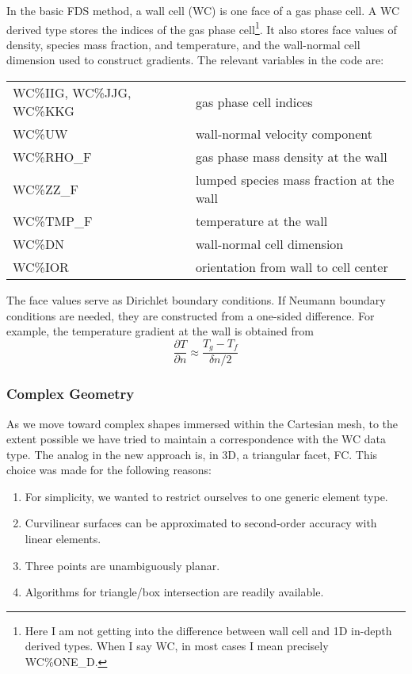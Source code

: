 \documentclass[12pt]{article}
\begin{document}
In the basic FDS method, a wall cell (WC) is one face of a gas phase cell.  A WC derived type stores the indices of the gas phase cell\footnote{Here I am not getting into the difference between wall cell and 1D in-depth derived types.  When I say WC, in most cases I mean precisely {\ct WC\%ONE\_D}.}.  It also stores face values of density, species mass fraction, and temperature, and the wall-normal cell dimension used to construct gradients.  The relevant variables in the code are:

\begin{table}[h!]
\begin{tabular}{ll}
{\ct WC\%IIG, WC\%JJG, WC\%KKG} & gas phase cell indices \\
{\ct WC\%UW}                    & wall-normal velocity component \\
{\ct WC\%RHO\_F}                & gas phase mass density at the wall \\
{\ct WC\%ZZ\_F}                 & lumped species mass fraction at the wall \\
{\ct WC\%TMP\_F}                & temperature at the wall \\
{\ct WC\%DN}                    & wall-normal cell dimension \\
{\ct WC\%IOR}                   & orientation from wall to cell center
\end{tabular}
\end{table}

The face values serve as Dirichlet boundary conditions.  If Neumann boundary conditions are needed, they are constructed from a one-sided difference.  For example, the temperature gradient at the wall is obtained from
\begin{equation}
\frac{\partial T}{\partial n} \approx \frac{T_g - T_f}{\delta n/2}
\end{equation}

\subsubsection{Complex Geometry}

As we move toward complex shapes immersed within the Cartesian mesh, to the extent possible we have tried to maintain a correspondence with the WC data type.  The analog in the new approach is, in 3D, a triangular facet, FC. This choice was made for the following reasons:
\begin{enumerate}[{\,\,\,\,(}a{)}]
\item For simplicity, we wanted to restrict ourselves to one generic element type.
\item Curvilinear surfaces can be approximated to second-order accuracy with linear elements.
\item Three points are unambiguously planar.
\item Algorithms for triangle/box intersection are readily available.
\end{enumerate}
\end{document}
